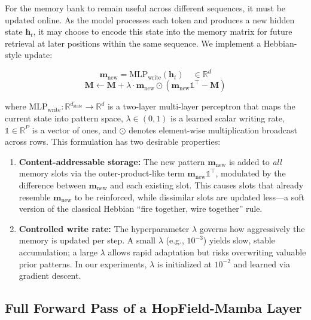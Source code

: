 \documentclass[journal,10pt]{IEEEtran}
\newcommand{\R}{\mathbb{R}}
\begin{document}
For the memory bank to remain useful across different sequences, it must be updated online. As the model processes each token and produces a new hidden state $\bm{h}_t$, it may choose to encode this state into the memory matrix for future retrieval at later positions within the same sequence. We implement a Hebbian-style update:

\begin{equation}
    \bm{m}_{\text{new}} = \text{MLP}_{\text{write}}(\bm{h}_t) \quad \in \R^d
    \label{eq:write_proj}
\end{equation}
\begin{equation}
    \bm{M} \leftarrow \bm{M} + \lambda \cdot \bm{m}_{\text{new}} \odot \left( \bm{m}_{\text{new}} \mathbb{1}^\top - \bm{M} \right)
    \label{eq:write_update}
\end{equation}

where $\text{MLP}_{\text{write}}: \R^{d_{\text{state}}} \to \R^d$ is a two-layer multi-layer perceptron that maps the current state into pattern space, $\lambda \in (0, 1)$ is a learned scalar writing rate, $\mathbb{1} \in \R^P$ is a vector of ones, and $\odot$ denotes element-wise multiplication broadcast across rows. This formulation has two desirable properties:

\begin{enumerate}
    \item \textbf{Content-addressable storage:} The new pattern $\bm{m}_{\text{new}}$ is added to \textit{all} memory slots via the outer-product-like term $\bm{m}_{\text{new}} \mathbb{1}^\top$, modulated by the difference between $\bm{m}_{\text{new}}$ and each existing slot. This causes slots that already resemble $\bm{m}_{\text{new}}$ to be reinforced, while dissimilar slots are updated less---a soft version of the classical Hebbian ``fire together, wire together'' rule.
    \item \textbf{Controlled write rate:} The hyperparameter $\lambda$ governs how aggressively the memory is updated per step. A small $\lambda$ (e.g., $10^{-3}$) yields slow, stable accumulation; a large $\lambda$ allows rapid adaptation but risks overwriting valuable prior patterns. In our experiments, $\lambda$ is initialized at $10^{-2}$ and learned via gradient descent.
\end{enumerate}

\subsection{Full Forward Pass of a HopField-Mamba Layer}
\label{sec:forward_pass}
\end{document}
